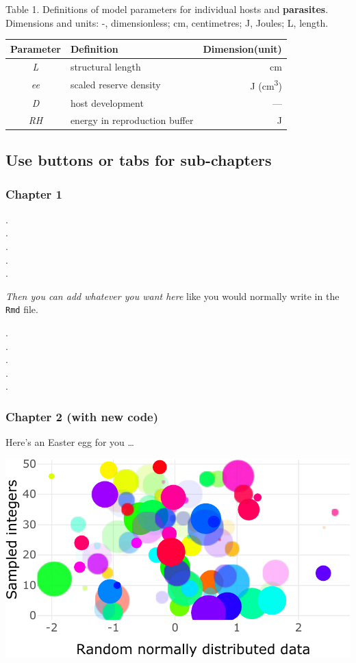 \documentclass[portrait]{article}
\begin{document}
Table 1. Definitions of model parameters for individual hosts and
\textbf{parasites}. Dimensions and units: -, dimensionless; cm,
centimetres; J, Joules; L, length.

\begin{longtable}[]{@{}clr@{}}
\toprule
Parameter & Definition & Dimension(unit)\tabularnewline
\midrule
\endhead
\emph{L} & structural length & cm\tabularnewline
\emph{ee} & scaled reserve density & J
(cm\textsuperscript{3})\tabularnewline
\emph{D} & host development & ---\tabularnewline
\emph{RH} & energy in reproduction buffer & J\tabularnewline
\bottomrule
\end{longtable}

\newpage  

\subsection{Use buttons or tabs for
sub-chapters}\label{use-buttons-or-tabs-for-sub-chapters}

\subsubsection{Chapter 1}\label{chapter-1}

.\\
.\\
.\\
.\\
.

\emph{Then you can add whatever you want here} like you would normally
write in the \texttt{Rmd} file.

.\\
.\\
.\\
.\\
.

\subsubsection{Chapter 2 (with new code)}\label{chapter-2-with-new-code}

Here's an Easter egg for you \ldots{}

\includegraphics{Lesson5_rmd_files/figure-latex/unnamed-chunk-3-1.pdf}
\end{document}
